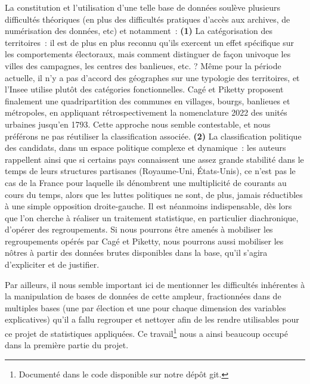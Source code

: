 \documentclass[a4paper,14pt]{article}
\begin{document}
\begin{multicols}{2}
La constitution et l'utilisation d'une telle base de données soulève plusieurs difficultés théoriques (en plus des difficultés pratiques d'accès aux archives, de numérisation des données, etc) et notamment~: 
\newline   
\textbf{(1)} La catégorisation des territoires~: il est de plus en plus reconnu qu'ils exercent un effet spécifique sur les comportements électoraux, mais comment distinguer de façon univoque les villes des campagnes, les centres des banlieues, etc. ? Même pour la période actuelle, il n'y a pas d'accord des géographes sur une typologie des territoires, et l'Insee utilise plutôt des catégories fonctionnelles.
Cagé et Piketty proposent finalement une quadripartition des communes en villages, bourgs, banlieues et métropoles, en appliquant rétrospectivement la nomenclature 2022 des unités urbaines jusqu'en 1793. Cette approche nous semble contestable, et nous préférons ne pas réutiliser la classification associée.
\newline
\textbf{(2)} La classification politique des candidats, dans un espace politique complexe et dynamique~: les auteurs rappellent ainsi que si certains pays connaissent une assez grande stabilité dans le temps de leurs structures partisanes (Royaume-Uni, États-Unis), ce n'est pas le cas de la France pour laquelle ils dénombrent une multiplicité de courants au cours du temps, alors que les luttes politiques ne sont, de plus, jamais réductibles à une simple opposition droite-gauche. Il est néanmoins indispensable, dès lors que l'on cherche à réaliser un traitement statistique, en particulier diachronique, d'opérer des regroupements. Si nous pourrons être amenés à mobiliser les regroupements opérés par Cagé et Piketty, nous pourrons aussi mobiliser les nôtres à partir des données brutes disponibles dans la base, qu'il s'agira d'expliciter et de justifier. 


Par ailleurs, il nous semble important ici de mentionner les difficultés inhérentes à la manipulation de bases de données de cette ampleur, fractionnées dans de multiples bases (une par élection et une pour chaque dimension des variables explicatives) qu'il a fallu regrouper et nettoyer afin de les rendre utilisables pour ce projet de statistiques appliquées. Ce travail\footnote{Documenté dans le code disponible sur notre dépôt git.} nous a ainsi beaucoup occupé dans la première partie du projet.


\end{multicols}
\end{document}
